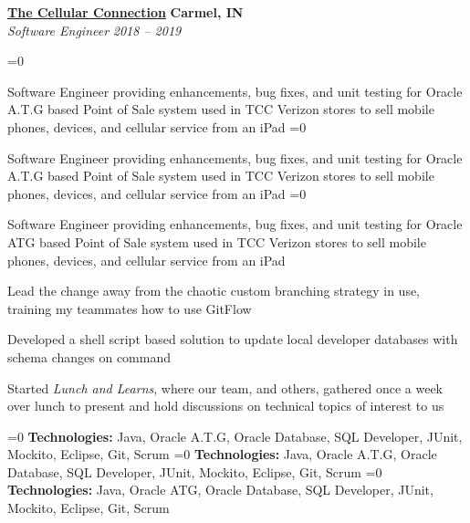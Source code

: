 %
    \headerrow
        {\textbf{\href{https://www.tccrocks.com/}{The Cellular Connection}}}
        {\textbf{Carmel, IN}}
    \\
    \headerrow
        {\emph{Software Engineer}}
        {\emph{2018 -- 2019}}
    \begin{itemize*}
        \ifnum{}=0
            \item Software Engineer providing enhancements, bug fixes, and unit testing for Oracle A.T.G
                based Point of Sale system used in TCC Verizon stores to sell mobile phones, devices, and cellular service from an iPad
        \fi
        \ifnum{}=0
            \item Software Engineer providing enhancements, bug fixes, and unit testing for Oracle A.T.G
                based Point of Sale system used in TCC Verizon stores to sell mobile phones, devices, and cellular service from an iPad
        \fi
        \ifnum{}=0
            \item Software Engineer providing enhancements, bug fixes, and unit testing for Oracle ATG
                based Point of Sale system used in TCC Verizon stores to sell mobile phones, devices, and cellular service from an iPad
        \fi
        \item Lead the change away from the chaotic custom branching strategy in use, training my teammates how to use GitFlow
        \item Developed a shell script based solution to update local developer databases with schema changes on command
        \item Started \emph{Lunch and Learns}, where our team, and others, gathered once a week over lunch to present and hold
            discussions on technical topics of interest to us
    \end{itemize*}

    \ifnum{}=0
    \hspace{1.0em}
        {\textbf{Technologies:} Java, Oracle A.T.G, Oracle Database, SQL Developer, JUnit, Mockito, Eclipse, Git, Scrum}
    \fi
    \ifnum{}=0
    \hspace{1.0em}
        {\textbf{Technologies:} Java, Oracle A.T.G, Oracle Database, SQL Developer, JUnit, Mockito, Eclipse, Git, Scrum}
    \fi
    \ifnum{}=0
    \hspace{1.0em}
        {\textbf{Technologies:} Java, Oracle ATG, Oracle Database, SQL Developer, JUnit, Mockito, Eclipse, Git, Scrum}
    \fi

